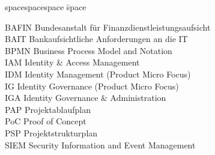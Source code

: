 \thispagestyle{empty}

\thispagestyle{empty}
\begin{tabbing}
spacespacespace \= space \kill

BAFIN	\>	Bundesanstalt für Finanzdienstleistungsaufsicht	\\
BAIT	\>	Bankaufsichtliche Anforderungen an die IT		\\
BPMN	\>	Business Process Model and Notation				\\
IAM		\>	Identity \& Access Management					\\
IDM		\>	Identity Management (Product Micro Focus)		\\
IG		\>	Identity Governance (Product Micro Focus)		\\
IGA		\>  Identity Governance \& Administration			\\
PAP		\>  Projektablaufplan								\\
PoC		\>	Proof of Concept								\\
PSP		\>  Projektstrukturplan								\\
SIEM	\>  Security Information and Event Management		\\






\end{tabbing}
\endinput
